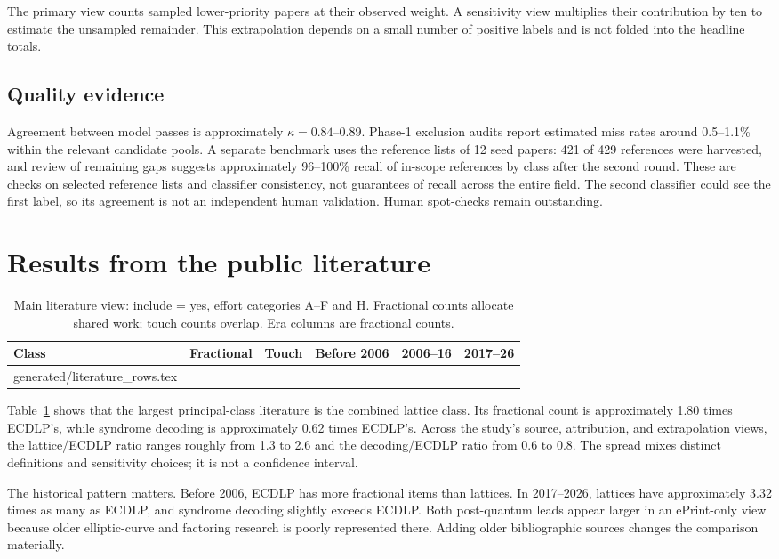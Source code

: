 \documentclass[11pt,letterpaper]{article}
\makeatletter
\let\inputrows\@@input
\makeatother
\begin{document}
The primary view counts sampled lower-priority papers at their observed weight. A sensitivity view multiplies their contribution by ten to estimate the unsampled remainder. This extrapolation depends on a small number of positive labels and is not folded into the headline totals.

\subsection{Quality evidence}
Agreement between model passes is approximately $\kappa=0.84$--$0.89$. Phase-1 exclusion audits report estimated miss rates around 0.5--1.1\% within the relevant candidate pools. A separate benchmark uses the reference lists of 12 seed papers: 421 of 429 references were harvested, and review of remaining gaps suggests approximately 96--100\% recall of in-scope references by class after the second round. These are checks on selected reference lists and classifier consistency, not guarantees of recall across the entire field. The second classifier could see the first label, so its agreement is not an independent human validation. Human spot-checks remain outstanding.\cite{study}

\section{Results from the public literature}
\begin{table}[htbp]
\centering\small
\caption{Main literature view: include = yes, effort categories A--F and H. Fractional counts allocate shared work; touch counts overlap. Era columns are fractional counts.}
\label{tab:literature}
\begin{tabular}{lrrrrr}\toprule
Class & Fractional & Touch & Before 2006 & 2006--16 & 2017--26\\\midrule
\inputrows generated/literature_rows.tex
\bottomrule\end{tabular}
\end{table}
Table~\ref{tab:literature} shows that the largest principal-class literature is the combined lattice class. Its fractional count is approximately 1.80 times ECDLP's, while syndrome decoding is approximately 0.62 times ECDLP's. Across the study's source, attribution, and extrapolation views, the lattice/ECDLP ratio ranges roughly from 1.3 to 2.6 and the decoding/ECDLP ratio from 0.6 to 0.8. The spread mixes distinct definitions and sensitivity choices; it is not a confidence interval.

The historical pattern matters. Before 2006, ECDLP has more fractional items than lattices. In 2017--2026, lattices have approximately 3.32 times as many as ECDLP, and syndrome decoding slightly exceeds ECDLP. Both post-quantum leads appear larger in an ePrint-only view because older elliptic-curve and factoring research is poorly represented there. Adding older bibliographic sources changes the comparison materially.
\end{document}
